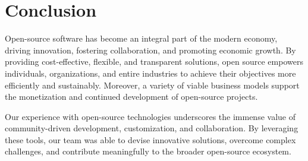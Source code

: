 \section{Conclusion}

Open-source software has become an integral part of the modern economy, driving innovation, fostering collaboration, 
and promoting economic growth. By providing cost-effective, flexible, and transparent solutions, open source empowers individuals, 
organizations, and entire industries to achieve their objectives more efficiently and sustainably. Moreover, 
a variety of viable business models support the monetization and continued development of open-source projects.

Our experience with open-source technologies underscores the immense value of community-driven development, customization, 
and collaboration. By leveraging these tools, our team was able to devise innovative solutions, overcome complex challenges, 
and contribute meaningfully to the broader open-source ecosystem.


\author{Luna Schätzle}